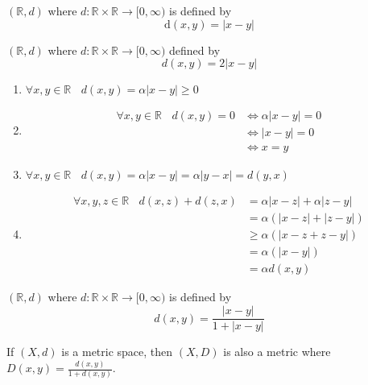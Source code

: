 \begin{example}
     $(\mathbb{R}, d)$ where $d: \mathbb{R} \times \mathbb{R} \rightarrow [0, \infty)$ is defined by
     $$\text{d}(x,y) = |x-y|$$
\end{example}

\begin{example}
    $(\mathbb{R}, d)$ where $d: \mathbb{R} \times \mathbb{R} \rightarrow [0, \infty)$ defined by
    $$d(x,y) = 2|x - y|$$

    \begin{enumerate}[$(i)$]
        \item $\forall x,y \in \mathbb{R} ~~~~d(x,y) = \alpha |x-y| \geq 0$
        \item \begin{align*} \forall x,y \in \mathbb{R} ~~~~d(x,y) = 0 &\iff \alpha |x-y| = 0 \\ &\iff |x-y| =0 \\ &\iff x=y \end{align*}
        \item $\forall x,y \in \mathbb{R} ~~~~ d(x,y) = \alpha |x-y| = \alpha |y-x| = d(y,x)$
        \item \begin{align*} \forall x,y,z \in \mathbb{R} ~~~~ d(x,z) + d(z,x) &= \alpha |x-z| + \alpha |z - y| \\ &= \alpha (|x-z| + |z-y|) \\ &\geq \alpha(|x-z+z-y|) \\ &= \alpha(|x-y|) \\ &= \alpha d(x,y)\end{align*}
    \end{enumerate}
\end{example}

\begin{example}
    $(\mathbb{R}, d)$ where $d: \mathbb{R} \times \mathbb{R} \rightarrow [0, \infty)$ is defined by
    $$d(x,y) = \frac{|x-y|}{1+|x-y|}$$
\end{example}

\begin{fact}
    If $(X,d)$ is a metric space, then $(X,D)$ is also a metric where $D(x,y) = \frac{d(x,y)}{1+d(x,y)}$.
\end{fact}

